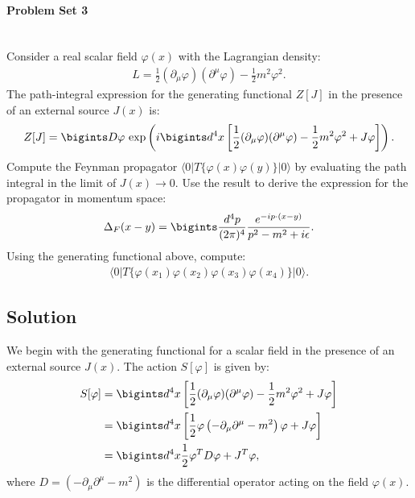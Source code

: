 \paragraph*{Problem Set 3} %
\\
Consider a real scalar field $\varphi(x)$ with the Lagrangian density:
\begin{align}
    L = \frac{1}{2} (\partial_\mu \varphi)(\partial^\mu \varphi) - \frac{1}{2} m^2 \varphi^2.
\end{align}
The path-integral expression for the generating functional $Z[J]$ in the presence of an external source $J(x)$ is:
\begin{align}
    Z[J] = \bigints D\varphi \, \exp \left( i \bigints d^4x \left[ \frac{1}{2} (\partial_\mu \varphi)(\partial^\mu \varphi) - \frac{1}{2} m^2 \varphi^2 + J \varphi \right] \right).
\end{align}
Compute the Feynman propagator $\langle 0 | T \{ \varphi(x) \varphi(y) \} | 0 \rangle$ by evaluating the path integral in the limit of $J(x) \to 0$. Use the result to derive the expression for the propagator in momentum space:
\begin{align}
    \Delta_F(x - y) = \bigints \frac{d^4 p}{(2\pi)^4} \frac{e^{-ip \cdot (x - y)}}{p^2 - m^2 + i\epsilon}.
\end{align}
Using the generating functional above, compute:
\begin{align}
    \langle 0 | T \{ \varphi(x_1) \varphi(x_2) \varphi(x_3) \varphi(x_4) \} | 0 \rangle.
\end{align}
\bigskip\bigskip\hline\hline\bigskip
\subsection*{Solution}
We begin with the generating functional for a scalar field in the presence of an external source $J(x)$. The action $S[\varphi]$ is given by:
\begin{align}
    S[\varphi] &= \bigints d^4x \left[ \frac{1}{2} (\partial_\mu \varphi)(\partial^\mu \varphi) - \frac{1}{2} m^2 \varphi^2 + J \varphi \right]\notag\\
    &= \bigints d^4x \left[ \frac{1}{2} \varphi \left( -\partial_\mu \partial^\mu - m^2 \right) \varphi + J \varphi \right]\notag\\
    &= \bigints d^4x \frac{1}{2} \varphi^T D \varphi + J^T \varphi,
\end{align}
where $D = \left( -\partial_\mu \partial^\mu - m^2 \right)$ is the differential operator acting on the field $\varphi(x)$.

